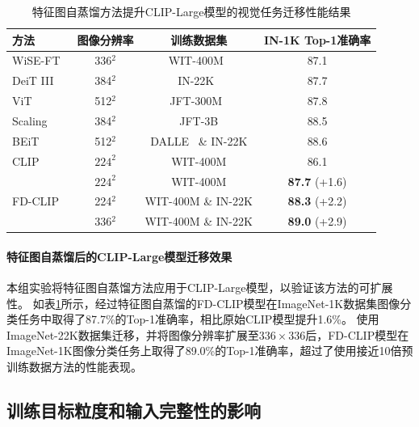 \begin{table}
\caption{
特征图自蒸馏方法提升CLIP-Large模型的视觉任务迁移性能结果
}
\centering
  \begin{tabular}{lccc}
\toprule
 方法 & 图像分辨率 & 训练数据集 & IN-1K Top-1准确率 \\
  \midrule
    WiSE-FT~\cite{ftclip2021} & 336$^2$ & WIT-400M~\cite{radford2021learning} & 87.1 \\
    DeiT III~\cite{touvron2022deit} & 384$^2$ & IN-22K~\cite{deng2009imagenet} & 87.7 \\
    ViT~\cite{dosovitskiy2020vit} & 512$^2$ & JFT-300M~\cite{Sun_2017_JFT300m} & 87.8 \\
   Scaling~\cite{zhai2022scaling} &  384$^2$ &  JFT-3B\cite{zhai2022scaling} &  88.5 \\
   BEiT~\cite{bao2021beit} &  512$^2$ &  DALLE~\cite{ramesh2021dalle1} \& IN-22K &  88.6 \\

  \midrule
  CLIP & $224^2$ & WIT-400M & 86.1 \\
  \midrule
  \multirow{3}{*}{FD-CLIP} & $224^2$ & WIT-400M & \textbf{87.7}\scriptsize{ (+1.6)} \\
   & 224$^2$ & WIT-400M \& IN-22K & \textbf{88.3}\scriptsize{ (+2.2)} \\
   & 336$^2$ & WIT-400M \& IN-22K & \textbf{89.0}\scriptsize{ (+2.9)} \\
\bottomrule
  \end{tabular}
\label{tab:fd-clip_large_FD}
\end{table}

\paragraph{特征图自蒸馏后的CLIP-Large模型迁移效果} 本组实验将特征图自蒸馏方法应用于CLIP-Large模型，以验证该方法的可扩展性。
如表\ref{tab:fd-clip_large_FD}所示，经过特征图自蒸馏的FD-CLIP模型在ImageNet-1K数据集图像分类任务中取得了87.7\%的Top-1准确率，相比原始CLIP模型提升1.6\%。
使用ImageNet-22K数据集迁移，并将图像分辨率扩展至$336\times 336$后，FD-CLIP模型在ImageNet-1K图像分类任务上取得了89.0\%的Top-1准确率，超过了使用接近10倍预训练数据方法\cite{zhai2022scaling}的性能表现。%

\subsection{训练目标粒度和输入完整性的影响}
\label{sec:fd-exp-input}

